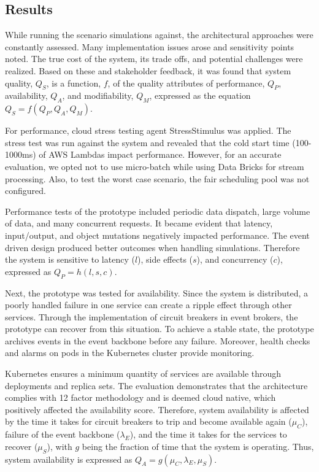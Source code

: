 \documentclass[a4paper,11pt]{article}
\begin{document}
\subsection{Results}
\nobreak{}
While running the scenario simulations against, the architectural approaches were constantly assessed. Many implementation issues arose and sensitivity points noted. The true cost of the system, its trade offs, and potential challenges were realized. Based on these and stakeholder feedback, it was found that system quality, $Q_S$, is a function, $f$, of the quality attributes of performance, $Q_P$, availability, $Q_A$, and modifiability, $Q_M$, expressed as the equation $Q_S = f(Q_P, Q_A, Q_M)$.

For performance, cloud stress testing agent StressStimulus was applied. The stress test was run against the system and revealed that the cold start time (100-1000ms) of AWS Lambdas impact performance. However, for an accurate evaluation, we opted not to use micro-batch while using Data Bricks for stream processing. Also, to test the worst case scenario, the fair scheduling pool was not configured. 

Performance tests of the prototype included periodic data dispatch, large volume of data, and many concurrent requests. It became evident that latency, input/output, and object mutations negatively impacted performance. The event driven design produced better outcomes when handling simulations.  Therefore the system is sensitive to latency ($l$), side effects ($s$), and concurrency ($c$), expressed as $Q_P = h(l, s, c)$.

Next, the prototype was tested for availability. Since the system is distributed, a poorly handled failure in one service can create a ripple effect through other services. Through the implementation of circuit breakers in event brokers, the prototype can recover from this situation. To achieve a stable state, the prototype archives events in the event backbone before any failure. Moreover, health checks and alarms on pods in the Kubernetes cluster provide monitoring. 

Kubernetes ensures a minimum quantity of services are available through deployments and replica sets. The evaluation demonstrates that the architecture complies with 12 factor methodology and is deemed cloud native, which positively affected the availability score. Therefore, system availability is affected by the time it takes for circuit breakers to trip and become available again ($\mu_C$), failure of the event backbone ($\lambda_E$), and the time it takes for the services to recover ($\mu_S$), with $g$ being the fraction of time that the system is operating. Thus, system availability is expressed as $Q_A = g(\mu_C, \lambda_E, \mu_S)$.
\end{document}
